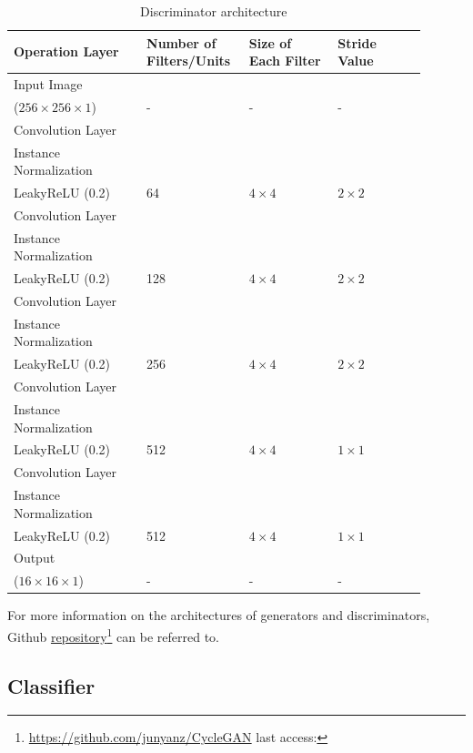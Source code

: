 \begin{table}[H]
    \centering

    \begin{tabular}{P{0.30\linewidth} P{0.20\linewidth} P{0.20\linewidth} P{0.20\linewidth}} 
        \toprule
        \textbf{Operation Layer} & \textbf{Number of Filters/Units}  & \textbf{Size of Each Filter} & \textbf{Stride Value}\\
        \toprule
        \toprule
        Input Image \\($256 \times 256 \times 1$) & - & - & -\\
        \midrule
        Convolution Layer\\Instance Normalization\\LeakyReLU (0.2) & 64 & $4 \times 4$ & $2 \times 2$\\
        \midrule
        Convolution Layer\\Instance Normalization\\LeakyReLU (0.2) & 128 & $4 \times 4$ & $2 \times 2$\\
        \midrule
        Convolution Layer\\Instance Normalization\\LeakyReLU (0.2) & 256 & $4 \times 4$ & $2 \times 2$\\
        \midrule
        Convolution Layer\\Instance Normalization\\LeakyReLU (0.2) & 512 & $4 \times 4$ & $1 \times 1$\\
        \midrule
        Convolution Layer\\Instance Normalization\\LeakyReLU (0.2) & 512 & $4 \times 4$ & $1 \times 1$\\
        \midrule
        \midrule
        Output  \\($16 \times 16 \times 1$) & - & - & -\\
        \bottomrule
    \end{tabular}
    \caption[Discriminator architecture]{Discriminator architecture}
    \label{table:DiscriminatorArchitecture}
\end{table}

For more information on the architectures of generators and discriminators, Github \href{https://github.com/junyanz/CycleGAN}{repository}\footnote{\url{https://github.com/junyanz/CycleGAN} last access: \dcdate} can be referred to. 



\subsection{Classifier}

